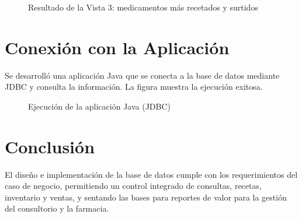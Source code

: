 \documentclass[stu,12pt,floatsintext]{apa7}
\begin{document}
\begin{figure}
    \caption{Resultado de la Vista 3: medicamentos más recetados y surtidos}
    \centering
    \label{fig:vista3}
\end{figure}

\section{Conexión con la Aplicación}
Se desarrolló una aplicación Java que se conecta a la base de datos mediante
JDBC y consulta la información. La figura muestra la ejecución exitosa.

\begin{figure}
    \caption{Ejecución de la aplicación Java (JDBC)}
    \centering
    \label{fig:app}
\end{figure}

\section{Conclusión}
El diseño e implementación de la base de datos cumple con los requerimientos del
caso de negocio, permitiendo un control integrado de consultas, recetas,
inventario y ventas, y sentando las bases para reportes de valor para la gestión
del consultorio y la farmacia.
\end{document}

